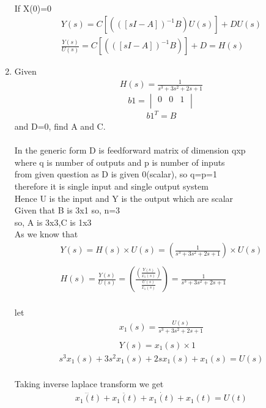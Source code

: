 \begin{enumerate}[label=\thesection.\arabic*.,ref=\thesection.\theenumi]
\\If X(0)=0
\begin{align*}
Y(s)=C[(([sI-A])^{-1}B)U(s)]+DU(s) \\
\frac{Y(s)}{U(s)}=C[(([sI-A])^{-1}B)]+D=H(s) 
\end{align*}
\item Given 
\begin{align*}
H(s)=\frac{1}{s^3+3s^2+2s+1}
\end{align*}
\begin{equation*}
 b1 =\begin{vmatrix}
  0&0&1\\
 \end{vmatrix}
\end{equation*}
\begin{align*}
b1^T=B
\end{align*}
and D=0, find A and C.
\\
\solution
\\ In the generic form D is feedforward matrix of dimension qxp
\\ where q is number of outputs and  p is number of inputs
\\ from given question as D is given 0(scalar), so q=p=1
\\ therefore it is single input and single output system
\\ Hence U is the input and Y is the output which are scalar
\\ Given that B is 3x1 so, n=3
\\ so, A is 3x3,C is 1x3
\\ As we know that
\begin{align*}
Y(s)=H(s) \times U(s)= (\frac{1}{s^3+3s^2+2s+1}) \times U(s) \\ \\
H(s)=\frac{Y(s)}{U(s)}=(\frac{(\frac{Y(s)}{x_{1}(s)})}{\frac{U(s)}{x_{1}(s)}})=\frac{1}{s^3+3s^2+2s+1} 
\end{align*}
\\let 
\begin{align*}  
x_{1}(s)=\frac{U(s)}{s^3+3s^2+2s+1} \\ \\
Y(s)=x_{1}(s)\times 1 
\end{align*}
\begin{align}
s^3x_{1}(s)+3s^2x_{1}(s)+2sx_{1}(s)+x_{1}(s)=U(s)
\end{align}
\\ Taking inverse laplace transform we get
\begin{align*}
\dddot{x_{1}(t)}+\ddot{x_{1}(t)}+\dot{x_{1}(t)}+x_{1}(t)=U(t)

\end{align*}
\end{enumerate}
